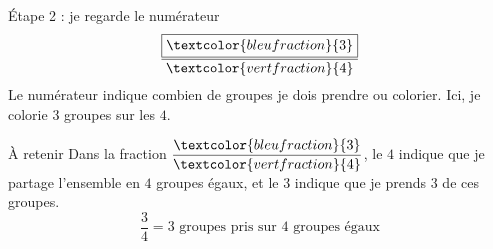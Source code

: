 \vspace{15pt}
\begin{astuce}{Étape 2 : je regarde le numérateur}
\[\dfrac{\boxed{\textcolor{bleufraction}{3}}}{\textcolor{vertfraction}{4}}\]
Le numérateur indique combien de groupes je dois prendre ou colorier. Ici, je colorie \textcolor{bleufraction}{$3$ groupes} sur les $4$.
\begin{center}
\end{center}
\end{astuce}

\vspace{15pt}
\begin{regle}{À retenir}
Dans la fraction $\dfrac{\textcolor{bleufraction}{3}}{\textcolor{vertfraction}{4}}$, le \textcolor{vertfraction}{$4$} indique que je partage l'ensemble en $4$ groupes égaux, et le \textcolor{bleufraction}{$3$} indique que je prends $3$ de ces groupes.
\[\dfrac{3}{4}=\text{$3$ groupes pris sur $4$ groupes égaux}\]
\end{regle}

\newcommand{\ballonbasket}{%
\begin{tikzpicture}[scale=0.32,baseline=-0.3cm]
    \draw[very thick] (0,0) circle (1);

    \draw[thick] (0,-1) .. controls (-0.45,-0.45) 
                            and (-0.45,0.45) .. (0,1);

    \draw[thick] (0,-1) .. controls (0.45,-0.45) 
                            and (0.45,0.45) .. (0,1);

    \draw[thick] (-1,0) -- (1,0);

    \draw[thick] (-0.75,-0.65) 
        .. controls (-0.1,-0.1) and (0.35,0.3) .. (0.75,0.65);
\end{tikzpicture}%
}
\newcommand{\smartphone}{%
\begin{tikzpicture}[scale=0.30,baseline=-0.35cm]

    \draw[very thick,rounded corners=3pt]
        (0,0) rectangle (1.5,2.6);

    \draw[thick,rounded corners=1pt]
        (0.15,0.35) rectangle (1.35,2.25);

    \draw[thick]
        (0.55,2.42) -- (0.95,2.42);

    \draw[thick]
        (0.75,0.17) circle (0.07);

\end{tikzpicture}%
}

